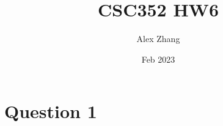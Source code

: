 \documentclass{article}
\title{CSC352 HW6}
\author{Alex Zhang}
\date{Feb 2023}
\begin{document}
\maketitle

\section*{Question 1}
\end{document}

